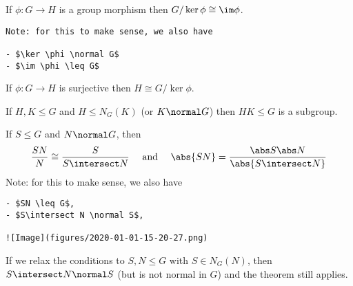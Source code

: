 \begin{theorem}

If \(\phi:G\to H\) is a group morphism then
\(G/\ker \phi \cong \im \phi\).

\begin{verbatim}
Note: for this to make sense, we also have

- $\ker \phi \normal G$
- $\im \phi \leq G$
\end{verbatim}

\end{theorem}

\begin{corollary}

If \(\phi: G\to H\) is surjective then \(H\cong G/\ker \phi\).

\end{corollary}

\begin{proposition}

If \(H,K \leq G\) and \(H \leq N_G(K)\) (or \(K \normal G\)) then
\(HK \leq G\) is a subgroup.

\end{proposition}

\begin{theorem}

If \(S \leq G\) and \(N \normal G\), then
\begin{align*}
    \frac{SN}{N} \cong \frac{S}{S\intersect N} \quad \text{ and }\quad \abs{SN} = \frac{\abs S \abs N}{\abs{S\intersect N}}
    \end{align*} Note: for this to make sense, we also have

\begin{verbatim}
- $SN \leq G$,
- $S\intersect N \normal S$,

![Image](figures/2020-01-01-15-20-27.png)
\end{verbatim}

\end{theorem}

\begin{corollary}

If we relax the conditions to \(S, N \leq G\) with \(S \in N_G(N)\),
then \(S\intersect N \normal S\) (but is not normal in \(G\)) and the
theorem still applies.

\end{corollary}

